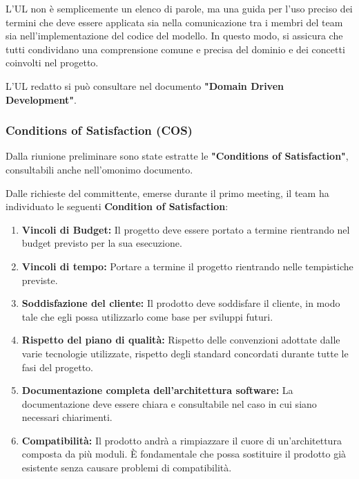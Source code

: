 L'UL non è semplicemente un elenco di parole, ma una guida per l'uso preciso dei
termini che deve essere applicata sia nella comunicazione tra i membri del team sia nell'implementazione del
codice del modello. In questo modo, si assicura che tutti condividano una comprensione comune e precisa del
dominio e dei concetti coinvolti nel progetto.

L'UL redatto si può consultare nel documento \textbf{"Domain Driven Development"}.

\subsubsection{Conditions of Satisfaction (COS)}
Dalla riunione preliminare sono state estratte le \textbf{"Conditions of Satisfaction"}, consultabili anche nell'omonimo documento.

Dalle richieste del committente, emerse durante il primo meeting, il team ha individuato le seguenti \textbf{Condition of
    Satisfaction}:

\begin{enumerate}
    \item \textbf{Vincoli di Budget:} Il progetto deve essere portato a termine rientrando nel budget previsto per la
          sua esecuzione.
    \item \textbf{Vincoli di tempo:} Portare a termine il progetto rientrando nelle tempistiche previste.
    \item \textbf{Soddisfazione del cliente:} Il prodotto deve soddisfare il cliente, in modo tale che egli possa
          utilizzarlo come base per sviluppi futuri.
    \item \textbf{Rispetto del piano di qualità:} Rispetto delle convenzioni adottate dalle varie tecnologie utilizzate,
          rispetto degli standard concordati durante tutte le fasi del progetto.
    \item \textbf{Documentazione completa dell'architettura software:} La documentazione deve essere chiara e consultabile
          nel caso in cui siano necessari chiarimenti.
    \item \textbf{Compatibilità:} Il prodotto andrà a rimpiazzare il cuore di un'architettura composta da più moduli.
          È fondamentale che possa sostituire il prodotto già esistente senza causare problemi di compatibilità.
\end{enumerate}


